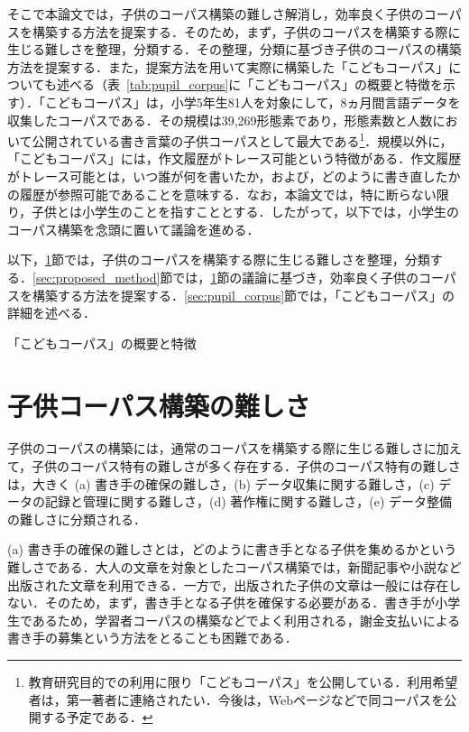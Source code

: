 \documentclass[japanese]{jnlp_1.4}
\begin{document}
  そこで本論文では，子供のコーパス構築の難しさ解消し，効率良く子供のコーパスを構築する方法を提案する．そのため，まず，子供のコーパスを構築する際に生じる難しさを整理，分類する．その整理，分類に基づき子供のコーパスの構築方法を提案する．また，提案方法を用いて実際に構築した「こどもコーパス」についても述べる（表~\ref{tab:pupil_corpus}に「こどもコーパス」の概要と特徴を示す）．「こどもコーパス」は，小学5年生81人を対象にして，8ヵ月間言語データを収集したコーパスである．その規模は39,269形態素であり，形態素数と人数において公開されている書き言葉の子供コーパスとして最大である\footnote{教育研究目的での利用に限り「こどもコーパス」を公開している．利用希望者は，第一著者に連絡されたい．今後は，Webページなどで同コーパスを公開する予定である．}．規模以外に，「こどもコーパス」には，作文履歴がトレース可能という特徴がある．作文履歴がトレース可能とは，いつ誰が何を書いたか，および，どのように書き直したかの履歴が参照可能であることを意味する．なお，本論文では，特に断らない限り，子供とは小学生のことを指すこととする．したがって，以下では，小学生のコーパス構築を念頭に置いて議論を進める．


以下，\ref{sec:problems}節では，子供のコーパスを構築する際に生じる難しさを整理，分類する．\ref{sec:proposed_method}節では，\ref{sec:problems}節の議論に基づき，効率良く子供のコーパスを構築する方法を提案する．\ref{sec:pupil_corpus}節では，「こどもコーパス」の詳細を述べる．
 
 
\begin{table}[h]
\caption{「こどもコーパス」の概要と特徴}
\label{tab:pupil_corpus}

\end{table}
\vspace{-1\baselineskip}



\section{子供コーパス構築の難しさ}\label{sec:problems}

  子供のコーパスの構築には，通常のコーパスを構築する際に生じる難しさに加えて，子供のコーパス特有の難しさが多く存在する．子供のコーパス特有の難しさは，大きく (a) 書き手の確保の難しさ，(b) データ収集に関する難しさ，(c) データの記録と管理に関する難しさ，(d) 著作権に関する難しさ，(e) データ整備の難しさに分類される．


  (a) 書き手の確保の難しさとは，どのように書き手となる子供を集めるかという難しさである．大人の文章を対象としたコーパス構築では，新聞記事や小説など出版された文章を利用できる．一方で，出版された子供の文章は一般には存在しない．そのため，まず，書き手となる子供を確保する必要がある．書き手が小学生であるため，学習者コーパス\cite{izumi,granger2}の構築などでよく利用される，謝金支払いによる書き手の募集という方法をとることも困難である．
\end{document}
